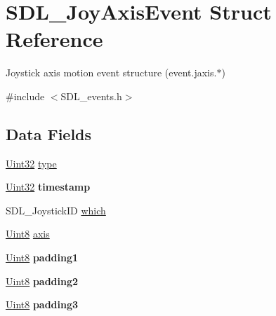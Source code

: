\hypertarget{struct_s_d_l___joy_axis_event}{}\section{S\+D\+L\+\_\+\+Joy\+Axis\+Event Struct Reference}
\label{struct_s_d_l___joy_axis_event}


Joystick axis motion event structure (event.\+jaxis.$\ast$)  




{\ttfamily \#include $<$S\+D\+L\+\_\+events.\+h$>$}

\subsection*{Data Fields}
\begin{DoxyCompactItemize}
\item 
\hyperlink{_s_d_l__stdinc_8h_add440eff171ea5f55cb00c4a9ab8672d}{Uint32} \hyperlink{struct_s_d_l___joy_axis_event_aa40a9b05c3154032b9f2d7220e9f08dc}{type}
\item 
\hyperlink{_s_d_l__stdinc_8h_add440eff171ea5f55cb00c4a9ab8672d}{Uint32} {\bfseries timestamp}\hypertarget{struct_s_d_l___joy_axis_event_abf1ed7edeab81db9c05d899836a44a2f}{}\label{struct_s_d_l___joy_axis_event_abf1ed7edeab81db9c05d899836a44a2f}

\item 
S\+D\+L\+\_\+\+Joystick\+ID \hyperlink{struct_s_d_l___joy_axis_event_a911f8b28e26cf5ad3e985e76d4987014}{which}
\item 
\hyperlink{_s_d_l__stdinc_8h_a2944638813a090aa23e62f4da842c3e2}{Uint8} \hyperlink{struct_s_d_l___joy_axis_event_a911494630318160a9e7ad91e3fe7e6a0}{axis}
\item 
\hyperlink{_s_d_l__stdinc_8h_a2944638813a090aa23e62f4da842c3e2}{Uint8} {\bfseries padding1}\hypertarget{struct_s_d_l___joy_axis_event_a418ddf227b900bac743797ea1d27040f}{}\label{struct_s_d_l___joy_axis_event_a418ddf227b900bac743797ea1d27040f}

\item 
\hyperlink{_s_d_l__stdinc_8h_a2944638813a090aa23e62f4da842c3e2}{Uint8} {\bfseries padding2}\hypertarget{struct_s_d_l___joy_axis_event_a09e3169fff93f108fc1dab93014eb1fb}{}\label{struct_s_d_l___joy_axis_event_a09e3169fff93f108fc1dab93014eb1fb}

\item 
\hyperlink{_s_d_l__stdinc_8h_a2944638813a090aa23e62f4da842c3e2}{Uint8} {\bfseries padding3}\hypertarget{struct_s_d_l___joy_axis_event_a2876881016c4222a885f1fabef292d1d}{}\label{struct_s_d_l___joy_axis_event_a2876881016c4222a885f1fabef292d1d}


\end{DoxyCompactItemize}
